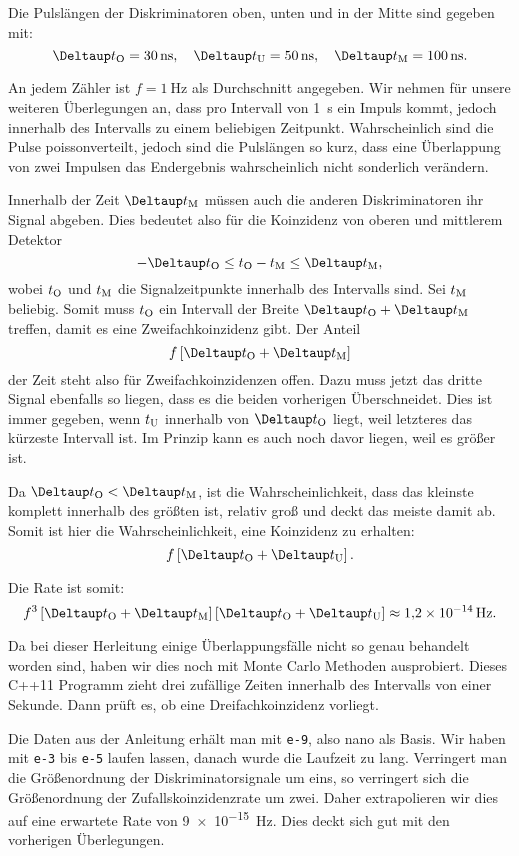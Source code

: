 \documentclass[11pt, ngerman, fleqn, DIV=15, headinclude, BCOR=2cm]{scrreprt}
\begin{document}
Die Pulslängen der Diskriminatoren oben, unten und in der Mitte sind gegeben
mit:
\[
    \DtO = \SI{30}{\nano\second}
    \eqnsep
    \DtU = \SI{50}{\nano\second}
    \eqnsep
    \DtM = \SI{100}{\nano\second}.
\]

An jedem Zähler ist $f = \SI{1}{\hertz}$ als Durchschnitt angegeben. Wir nehmen
für unsere weiteren Überlegungen an, dass pro Intervall von \SI{1}{\second} ein
Impuls kommt, jedoch innerhalb des Intervalls zu einem beliebigen Zeitpunkt.
Wahrscheinlich sind die Pulse poissonverteilt, jedoch sind die Pulslängen so
kurz, dass eine Überlappung von zwei Impulsen das Endergebnis wahrscheinlich
nicht sonderlich verändern.

Innerhalb der Zeit $\DtM$ müssen auch die anderen Diskriminatoren ihr Signal
abgeben. Dies bedeutet also für die Koinzidenz von oberen und mittlerem
Detektor
\[
    - \DtO \leq t_\text O - t_\text M \leq \DtM,
\]
wobei $t_\text O$ und $t_\text M$ die Signalzeitpunkte innerhalb des Intervalls
sind. Sei $t_\text M$ beliebig. Somit muss $t_\text O$ ein Intervall der Breite
$\DtO + \DtM$ treffen, damit es eine Zweifachkoinzidenz gibt. Der Anteil
\[
    f \sbr{\DtO + \DtM}
\]
der Zeit steht also für Zweifachkoinzidenzen offen. Dazu muss jetzt das dritte
Signal ebenfalls so liegen, dass es die beiden vorherigen Überschneidet. Dies
ist immer gegeben, wenn $t_\text U$ innerhalb von $\DtO$ liegt, weil letzteres
das kürzeste Intervall ist. Im Prinzip kann es auch noch davor liegen, weil es
größer ist.

Da $\DtO < \DtM$, ist die Wahrscheinlichkeit, dass das kleinste komplett
innerhalb des größten ist, relativ groß und deckt das meiste damit ab. Somit
ist hier die Wahrscheinlichkeit, eine Koinzidenz zu erhalten:
\[
    f \sbr{\DtO + \DtU}.
\]

Die Rate ist somit:
\[
    f^3 \sbr{\DtO + \DtM} \sbr{\DtO + \DtU} \approx \SI{1.2e-14}{\hertz}.
\]

Da bei dieser Herleitung einige Überlappungsfälle nicht so genau behandelt
worden sind, haben wir dies noch mit Monte Carlo Methoden ausprobiert. Dieses
C++11 Programm zieht drei zufällige Zeiten innerhalb des Intervalls von einer
Sekunde. Dann prüft es, ob eine Dreifachkoinzidenz vorliegt.



Die Daten aus der Anleitung erhält man mit \texttt{e-9}, also nano als Basis.
Wir haben mit \texttt{e-3} bis \texttt{e-5} laufen lassen, danach wurde die
Laufzeit zu lang. Verringert man die Größenordnung der Diskriminatorsignale um
eins, so verringert sich die Größenordnung der Zufallskoinzidenzrate um zwei.
Daher extrapolieren wir dies auf eine erwartete Rate von \SI{9e-15}{\hertz}.
Dies deckt sich gut mit den vorherigen Überlegungen.
\end{document}
